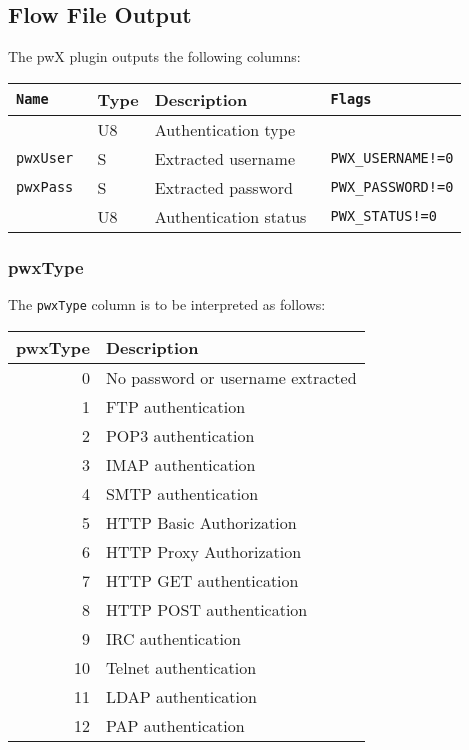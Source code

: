 \documentclass[documentation]{subfiles}
\begin{document}

\subsection{Flow File Output}
The pwX plugin outputs the following columns:
\begin{longtable}{>{\tt}lll>{\tt\small}l}
    \toprule
    {\bf Name} & {\bf Type} & {\bf Description} & {\bf Flags}\\
    \midrule\endhead%
    \nameref{pwxType}   & U8 & Authentication type   & \\
    pwxUser             & S  & Extracted username    & PWX\_USERNAME!=0\\
    pwxPass             & S  & Extracted password    & PWX\_PASSWORD!=0\\
    \nameref{pwxStatus} & U8 & Authentication status & PWX\_STATUS!=0\\
    \bottomrule
\end{longtable}

\subsubsection{pwxType}\label{pwxType}
The {\tt pwxType} column is to be interpreted as follows:
\begin{longtable}{rl}
    \toprule
    {\bf pwxType} & {\bf Description}\\
    \midrule\endhead%
     0 & No password or username extracted\\
     1 & FTP authentication\\
     2 & POP3 authentication\\
     3 & IMAP authentication\\
     4 & SMTP authentication\\
     5 & HTTP Basic Authorization\\
     6 & HTTP Proxy Authorization\\
     7 & HTTP GET authentication\\
     8 & HTTP POST authentication \\
     9 & IRC authentication \\
    10 & Telnet authentication \\
    11 & LDAP authentication \\
    12 & PAP authentication \\
    \bottomrule
\end{longtable}
\end{document}
